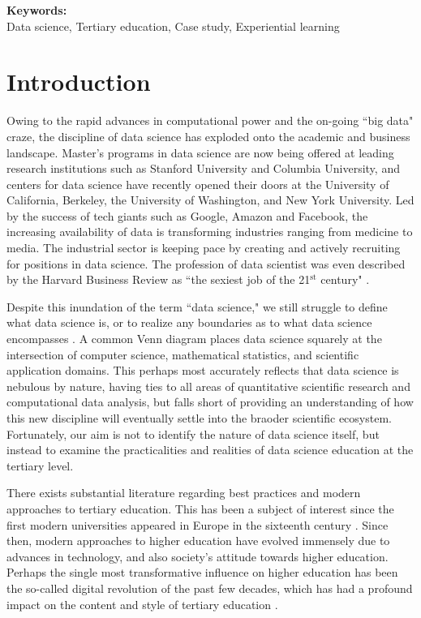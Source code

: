 \documentclass[12pt]{article}
\begin{document}
\vspace{0.4in}

\textbf{Keywords:} \\
\indent \indent Data science, Tertiary education, Case study, Experiential learning

\thispagestyle{empty}
\newpage

\section{Introduction}

Owing to the rapid advances in computational power and the on-going ``big data" craze, the discipline of data science has exploded onto the academic and business landscape. Master's programs in data science are now being offered at leading research institutions such as Stanford University and Columbia University, and centers for data science have recently opened their doors at the University of California, Berkeley, the University of Washington, and New York University. Led  by the success of tech giants such as Google, Amazon and Facebook, the increasing availability of data is transforming industries ranging from medicine to media.  The industrial sector is keeping pace by creating and actively recruiting for positions in data science.  The profession of data scientist was even described by the Harvard Business Review as ``the sexiest job of the 21$^{\text{st}}$ century" \citep{Patil2012}.

Despite this inundation of the term ``data science," we still struggle to define what data science is, or to realize any boundaries as to what data science encompasses \citep{Hayashi1998, Loukides2011, Provost2013}. A common Venn diagram places data science squarely at the intersection of computer science, mathematical statistics, and scientific application domains.  This perhaps most accurately reflects that data science is nebulous by nature, having ties to all areas of quantitative scientific research and computational data analysis, but falls short of providing an understanding of how this new discipline will eventually settle into the braoder scientific ecosystem.  Fortunately, our aim is not to identify the nature of data science itself, but instead to examine the practicalities and realities of data science education at the tertiary level.

There exists substantial literature regarding best practices and modern approaches to tertiary education. This has been a subject of interest since the first modern universities appeared in Europe in the sixteenth century \citep{Rudy1984, Pedersen1997}.  Since then, modern approaches to higher education have evolved immensely due to advances in technology, and also society's attitude towards higher education.  Perhaps the single most transformative influence on higher education has been the so-called digital revolution of the past few decades, which has had a profound impact on the content and style of tertiary education \citep{Roberts1994, Ely1995, Baker1997, Wood2005, Baek2008}.
\end{document}
